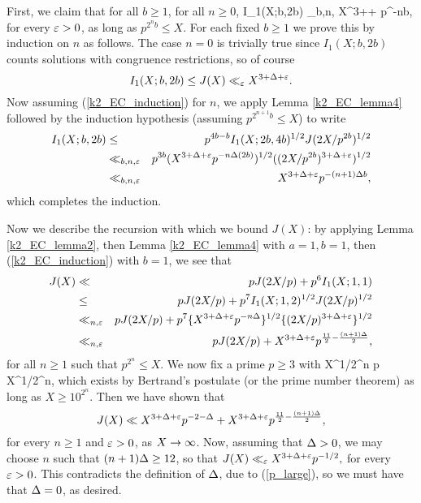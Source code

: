 \documentclass[brochure,english,12pt]{bourbaki}%
\begin{document}
First, we claim that for all $b \geq 1$, for all $n \geq 0$, 
\beq\label{k2_EC_induction}
 I_1(X;b,2b) \ll_{b,n,\ep} X^{3+\Del+\ep} p^{-n\Del b},
 \eeq
for every $\varepsilon>0$, as long as $p^{2^nb} \leq X$.
 For each fixed $b \geq 1$ we prove this by induction on $n$ as follows.  The case $n=0$ is trivially true since $I_1(X;b,2b)$ counts solutions with congruence restrictions, so of course
 \[I_1(X;b,2b) \leq J(X) \ll_\varepsilon X^{3+\Delta+\varepsilon}.\]
 Now assuming (\ref{k2_EC_induction}) for $n$, we apply Lemma \ref{k2_EC_lemma4} followed by the induction hypothesis (assuming $p^{2^{n+1}b} \leq X$) to write 
 \begin{eqnarray*}
  I_1(X;b,2b)& \leq & 		p^{4b-b} I_1(X;2b,4b)^{1/2}J(2X/p^{2b})^{1/2}	\\
  	& \ll_{b,n,\varepsilon} & p^{3b} (X^{3+\Delta+\varepsilon} p^{-n\Delta (2b)})^{1/2} ( (2X/p^{2b})^{3 +\Delta+\varepsilon})^{1/2} \\
	& \ll_{b,n,\varepsilon} & X^{3+\Delta+\varepsilon}  p^{-(n+1)\Delta b} ,
  \end{eqnarray*}
which completes the induction.

Now we describe the recursion with which we bound $J(X)$: by applying Lemma \ref{k2_EC_lemma2}, then  Lemma \ref{k2_EC_lemma4} with $a=1,b=1$, then (\ref{k2_EC_induction}) with $b=1$, we see that 
\begin{eqnarray*}
J(X) & \ll & p J(2X/p) + p^6 I_1(X;1,1) \\
	& \leq & pJ(2X/p) + p^7 I_1(X;1,2)^{1/2} J(2X/p)^{1/2} \\
	& \ll_{n,\varepsilon} & pJ(2X/p) + p^7 \{X^{3+\Delta+\varepsilon} p^{-n\Delta} \}^{1/2} \{ (2X/p)^{3 + \Delta + \varepsilon} \}^{1/2} \\
	& \ll_{n,\varepsilon} & pJ(2X/p) + X^{3+\Delta+\varepsilon} p^{\frac{11}{2} - \frac{(n+1)\Delta}{2}},
\end{eqnarray*}
for all $n \geq 1$ such that $p^{2^{n}} \leq X$. 
We now fix a prime $p \geq 3$ with 
\beq\label{p_large}
  X^{1/2^n}  \leq p \leq X^{1/2^n},
 \eeq
which exists by Bertrand's postulate (or the prime number theorem) as long as $X \geq 10^{2^n}$.
Then we have shown that 
\[ J(X)
 \ll X^{3 + \Delta + \varepsilon} p^{-2-\Delta} + X^{3+\Delta+\varepsilon} p^{\frac{11}{2} - \frac{(n+1)\Delta}{2}} ,\]
for every $n\geq1$ and $\varepsilon>0$, as $X \rightarrow \infty$.
Now, assuming that $\Delta>0$, we may choose $n$ such that $(n+1)\Delta \geq 12$, so that $J(X) \ll_\varepsilon X^{3+\Delta+\varepsilon} p^{-1/2},$ for every $\varepsilon>0$. This contradicts the definition of $\Delta$, due to (\ref{p_large}), so we must have that $\Delta=0$, as desired.
\end{document}

